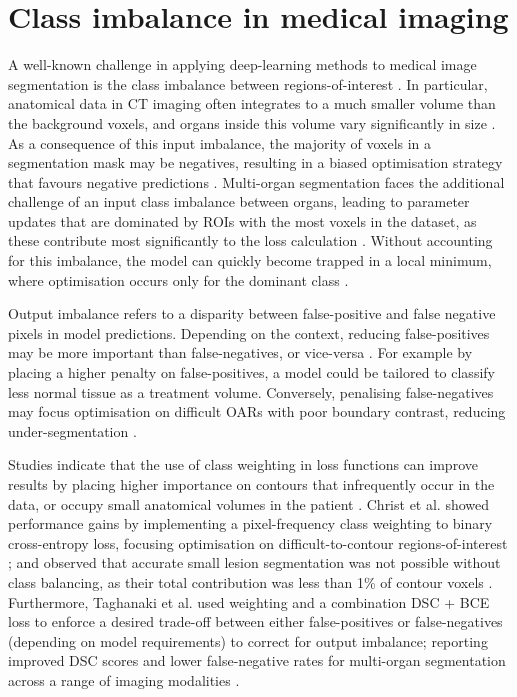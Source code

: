 \section{Class imbalance in medical imaging}
A well-known challenge in applying deep-learning methods to medical image
segmentation is the class imbalance between regions-of-interest
\cite{Hesamian2019}. In particular, anatomical data in CT imaging often
integrates to a much smaller volume than the background voxels, and organs
inside this volume vary significantly in size \cite{taghanaki2018}. As a
consequence of this input imbalance, the majority of voxels in a segmentation
mask may be negatives, resulting in a biased optimisation strategy that favours
negative predictions \cite{taghanaki2018}. Multi-organ segmentation faces the
additional challenge of an input class imbalance between organs, leading to
parameter updates that are dominated by ROIs with the most voxels in the
dataset, as these contribute most significantly to the loss calculation
\cite{Khan2019}. Without accounting for this imbalance, the model can quickly
become trapped in a local minimum, where optimisation occurs only for the
dominant class \cite{Khan2019}.

Output imbalance refers to a disparity between false-positive and false negative
pixels in model predictions. Depending on the context, reducing false-positives
may be more important than false-negatives, or vice-versa \cite{taghanaki2018}.
For example by placing a higher penalty on false-positives, a model could be
tailored to classify less normal tissue as a treatment volume. Conversely,
penalising false-negatives may focus optimisation on difficult OARs with poor
boundary contrast, reducing under-segmentation \cite{taghanaki2018}.

Studies indicate that the use of class weighting in loss functions can improve
results by placing higher importance on contours that infrequently occur in the
data, or occupy small anatomical volumes in the patient \cite{taghanaki2018}.
Christ et al. showed performance gains by implementing a pixel-frequency class
weighting to binary cross-entropy loss, focusing optimisation on
difficult-to-contour regions-of-interest \cite{ferdin2017}; and observed that
accurate small lesion segmentation was not possible without class balancing, as
their total contribution was less than 1\% of contour voxels \cite{ferdin2017}.
Furthermore, Taghanaki et al. used weighting and a combination DSC + BCE loss to
enforce a desired trade-off between either false-positives or false-negatives
(depending on model requirements) to correct for output imbalance; reporting
improved DSC scores and lower false-negative rates for multi-organ segmentation
across a range of imaging modalities \cite{taghanaki2018}.

